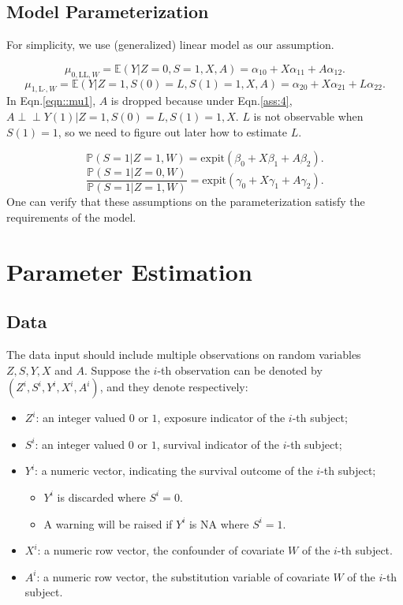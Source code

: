 \documentclass[article]{jss}
\def\ci{\perp\!\!\!\perp}
\def\expit{\mathrm{expit}}
\begin{document}
\subsection{Model Parameterization}\label{subsec:ModelParameterization}
For simplicity, we use (generalized) linear model as our assumption.

\begin{equation}
  \mu_{0,\text{LL},W} = \mathbb{E}(Y|Z=0,S=1,X,A) = \alpha_{10} + X\alpha_{11}+A\alpha_{12}.
\end{equation}
\begin{equation}
  \mu_{1,\text{L}\cdot,W} = \mathbb{E}(Y|Z=1,S(0)=L,S(1)=1,X,A) = \alpha_{20} + X\alpha_{21}+L\alpha_{22}.
  \label{eqn::mu1}
\end{equation}
In Eqn.\ref{eqn::mu1}, $A$ is dropped because under Eqn.\ref{ass:4}, $A\ci Y(1)|Z=1,S(0)=L,S(1)=1,X$. $L$ is not observable when $S(1)=1$, so we need to figure out later how to estimate $L$.

\begin{equation}
  \mathbb{P}(S=1|Z=1,W) = \expit(\beta_{0}+X\beta_{1}+A\beta_2).
\end{equation}
\begin{equation}
  \frac{\mathbb{P}(S=1|Z=0,W)}{\mathbb{P}(S=1|Z=1,W)} = \expit(\gamma_{0}+X\gamma_{1}+A\gamma_2).
\end{equation}
One can verify that these assumptions on the parameterization satisfy the requirements of the model.

\section{Parameter Estimation} \label{sec:ParameterEstimation}

\subsection{Data}

The data input should include multiple observations on random variables $Z,S,Y,X$ and $A$. Suppose the $i$-th observation can be denoted by $(Z^i,S^i,Y^i,X^i,A^i)$, and they denote respectively:
\begin{itemize}
  \item $Z^i$: an integer valued $0$ or $1$, exposure indicator of the $i$-th subject;
  \item $S^i$: an integer valued $0$ or $1$, survival indicator of the $i$-th subject;
  \item $Y^i$: a numeric vector, indicating the survival outcome of the $i$-th subject;
  \begin{itemize}
    \item $Y^i$ is discarded where $S^i=0$.
    \item A warning will be raised if $Y^i$ is NA where $S^i=1$.
  \end{itemize}
  \item $X^i$: a numeric row vector, the confounder of covariate $W$ of the $i$-th subject.
  \item $A^i$: a numeric row vector, the substitution variable of covariate $W$ of the $i$-th subject.
\end{itemize}
\end{document}
